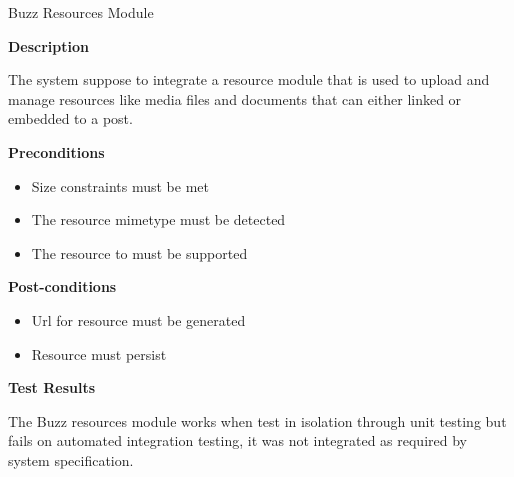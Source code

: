 \item Buzz Resources Module

\textbf{Description}
	
The system suppose to integrate a resource module that is used to upload and manage resources like media files and documents that can either linked or embedded to a post.
	
\textbf{Preconditions}
\begin{itemize}
	\item Size constraints must be met
	\item The resource mimetype must be detected
	\item The resource to must be supported
\end{itemize}

\textbf{Post-conditions}
\begin{itemize}
\item Url for resource must be generated
\item Resource must persist
\end{itemize}

\textbf{Test Results}

The Buzz resources module works when test in isolation through unit testing but fails on automated integration testing, it was not integrated as required by system specification. 



		 		 